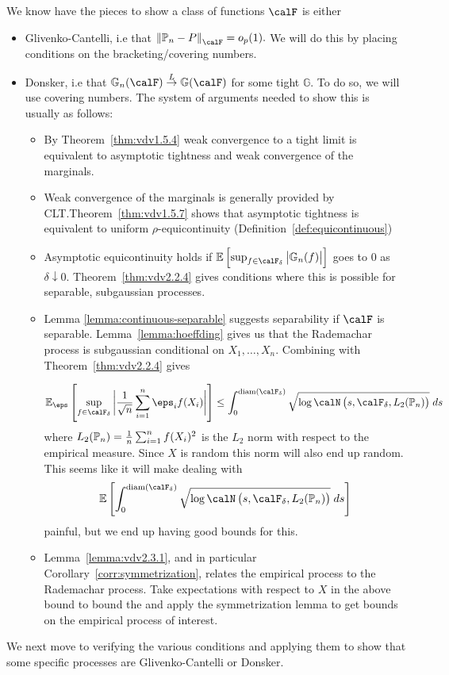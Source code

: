 We know have the pieces to show a class of functions \(\calF\) is either
\begin{itemize}
	 \item Glivenko-Cantelli, i.e that  \(
			\left\|\P_n-P\right\|_\calF = o_p(1)
			.\) We will do this by placing conditions on the bracketing/covering numbers.
	\item Donsker, i.e that \(\mathbb{G}_n(\calF) \overset{L}{\to}\mathbb{G}(\calF)\) for some tight \(\mathbb{G}\). To do so, we will use covering numbers. The system of arguments needed to show this is usually as follows:
	\begin{itemize}
		\item By Theorem~\ref{thm:vdv1.5.4} weak convergence to a tight limit is equivalent to asymptotic tightness and weak convergence of the marginals. 
		\item Weak convergence of the marginals is generally provided by CLT.Theorem~\ref{thm:vdv1.5.7} shows that asymptotic tightness is equivalent to uniform \(\rho\)-equicontinuity (Definition~\ref{def:equicontinuous})
		\item Asymptotic equicontinuity holds if \(\E\left[\sup_{f\in\calF_\delta}\left|\mathbb{G}_n(f)\right|\right]\) goes to 0 as \(\delta\downarrow 0\). Theorem~\ref{thm:vdv2.2.4} gives conditions where this is possible for separable, subgaussian processes.

		\item Lemma \ref{lemma:continuous-separable} suggests separability if \(\calF\) is separable. Lemma~\ref{lemma:hoeffding} gives us that the Rademachar process is subgaussian conditional on \(X_1,\dots,X_n\). Combining with Theorem~\ref{thm:vdv2.2.4} gives

		\[
			\E_\eps\left[\sup_{f\in\calF_\delta}\bigg|\frac{1}{\sqrt n}\sum_{i=1}^n \eps_i f(X_i)\bigg| \right] \leq \int_{0}^{\text{diam}(\calF_\delta)}\sqrt{\log\calN\left(s,\calF_\delta,L_2(\P_n)\right)}\; ds
		\]
		where \(L_2(\P_n) = \frac{1}{n}\sum_{i=1}^n f(X_i)^2 \) is the \(L_2\) norm with respect to the empirical measure. Since \(X\) is random this norm will also end up random. This seems like it will make dealing with
			\[
				\E\left[\int_{0}^{\text{diam}(\calF_\delta)}\sqrt{\log\calN\left(s,\calF_\delta,L_2(\P_n)\right)}\;ds  \right]
			\] 
			painful, but we end up having good bounds for this.
		\item Lemma~\ref{lemma:vdv2.3.1}, and in particular Corollary~\ref{corr:symmetrization}, relates the empirical process to the Rademachar process. Take expectations with respect to \(X\) in the above bound to bound the and apply the symmetrization lemma to get bounds on the empirical process of interest.
	\end{itemize}
\end{itemize}
We next move to verifying the various conditions and applying them to show that some specific processes are Glivenko-Cantelli or Donsker.

